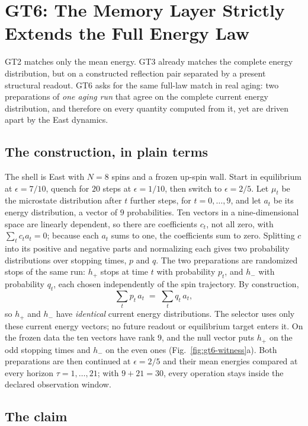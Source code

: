 \section{GT6: The Memory Layer Strictly Extends the Full Energy Law}
\label{sec:gt6}

GT2 matches only the mean energy. GT3 already matches the complete energy distribution, but on a
constructed reflection pair separated by a present structural readout. GT6 asks for the same
full-law match in real aging: two preparations of \emph{one aging run} that agree on the complete
current energy distribution, and therefore on every quantity computed from it, yet are driven
apart by the East dynamics.

\subsection{The construction, in plain terms}

The shell is East with $N=8$ spins and a frozen up-spin wall. Start in equilibrium at
$\epsilon = 7/10$, quench for $20$ steps at $\epsilon = 1/10$, then switch to $\epsilon = 2/5$.
Let $\mu_t$ be the microstate distribution after $t$ further steps, for $t = 0, \ldots, 9$, and let
$a_t$ be its energy distribution, a vector of $9$ probabilities. Ten vectors in a nine-dimensional
space are linearly dependent, so there are coefficients $c_t$, not all zero, with
$\sum_t c_t a_t = 0$; because each $a_t$ sums to one, the coefficients sum to zero. Splitting $c$ into its positive and negative parts and
normalizing each gives two probability distributions over stopping times, $p$ and $q$. The two
preparations are randomized stops of the same run: $h_+$ stops at time $t$ with probability $p_t$,
and $h_-$ with probability $q_t$, each chosen independently of the spin trajectory. By
construction,
\[
  \textstyle\sum_t p_t\, a_t \;=\; \sum_t q_t\, a_t ,
\]
so $h_+$ and $h_-$ have \emph{identical} current energy distributions. The selector uses only these
current energy vectors; no future readout or equilibrium target enters it. On the frozen data the
ten vectors have rank $9$, and the null vector puts $h_+$ on the odd stopping times and $h_-$ on
the even ones (Fig.~\ref{fig:gt6-witness}a). Both preparations are then continued at
$\epsilon=2/5$ and their mean energies compared at every horizon $\tau = 1, \ldots, 21$; with
$9 + 21 = 30$, every operation stays inside the declared observation window.

\subsection{The claim}

